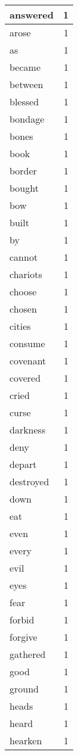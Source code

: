 \begin{center}
\begin{longtable}{l|r}
answered & 1 \\ \hline
arose & 1 \\ \hline
as & 1 \\ \hline
became & 1 \\ \hline
between & 1 \\ \hline
blessed & 1 \\ \hline
bondage & 1 \\ \hline
bones & 1 \\ \hline
book & 1 \\ \hline
border & 1 \\ \hline
bought & 1 \\ \hline
bow & 1 \\ \hline
built & 1 \\ \hline
by & 1 \\ \hline
cannot & 1 \\ \hline
chariots & 1 \\ \hline
choose & 1 \\ \hline
chosen & 1 \\ \hline
cities & 1 \\ \hline
consume & 1 \\ \hline
covenant & 1 \\ \hline
covered & 1 \\ \hline
cried & 1 \\ \hline
curse & 1 \\ \hline
darkness & 1 \\ \hline
deny & 1 \\ \hline
depart & 1 \\ \hline
destroyed & 1 \\ \hline
down & 1 \\ \hline
eat & 1 \\ \hline
even & 1 \\ \hline
every & 1 \\ \hline
evil & 1 \\ \hline
eyes & 1 \\ \hline
fear & 1 \\ \hline
forbid & 1 \\ \hline
forgive & 1 \\ \hline
gathered & 1 \\ \hline
good & 1 \\ \hline
ground & 1 \\ \hline
heads & 1 \\ \hline
heard & 1 \\ \hline
hearken & 1 \\ \hline

\end{longtable}
\end{center}
